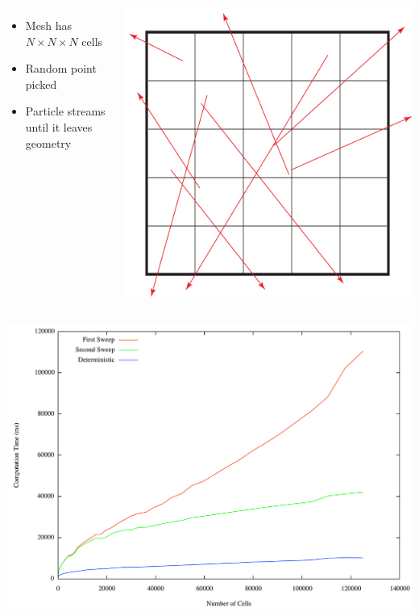 \documentclass{beamer}
\begin{document}
\begin{frame}
\begin{columns}[c]
\begin{itemize}
    \item Mesh has $N\times N \times N$ cells
    \item Random point picked
    \item Particle streams until it leaves geometry
\end{itemize}

    \includegraphics[width=\textwidth, keepaspectratio]{MeshCompGraphic}
\end{columns}
\end{frame}
\begin{frame}
    \includegraphics[width=\textwidth, keepaspectratio]{MeshComparison}
\end{frame}
\end{document}
